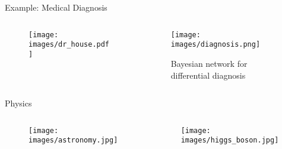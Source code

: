 \documentclass{beamer}
\newcommand{\1}{\mathbf{1}}
\begin{document}
\begin{frame}{Example: Medical Diagnosis}
  \begin{columns}

    \begin{column}{0.4\textwidth}
      \begin{figure}
        \centering
        \texttt{[image: images/dr\_house.pdf]} %
      \end{figure}
    \end{column}

    \begin{column}{0.6\textwidth}
      \begin{figure}
        \centering
        \texttt{[image: images/diagnosis.png]}
        \caption{Bayesian network for differential diagnosis}
      \end{figure}
    \end{column}

  \end{columns}
\end{frame}

\begin{frame}{Physics}
  \begin{columns}

    \begin{column}{0.5\textwidth}
      \begin{figure}
        \centering
        \texttt{[image: images/astronomy.jpg]} %
      \end{figure}
    \end{column}

    \begin{column}{0.5\textwidth}
      \begin{figure}
        \centering
        \texttt{[image: images/higgs\_boson.jpg]}
      \end{figure}
    \end{column}

  \end{columns}
\end{frame}
\end{document}
